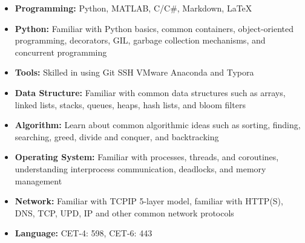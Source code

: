 \ifzh
{}
\begin{competences}
\end{competences}
\else
{}
\begin{itemize}[leftmargin=1.5em]
    \item \textbf{Programming:} Python, MATLAB, C/C\#, Markdown, \LaTeX
    \item \textbf{Python:} Familiar with Python basics, common containers, object-oriented programming, decorators, GIL, garbage collection mechanisms, and concurrent programming
    \item \textbf{Tools:} Skilled in using Git SSH VMware Anaconda and Typora
    \item \textbf{Data Structure:} Familiar with common data structures such as arrays, linked lists, stacks, queues, heaps, hash lists, and bloom filters
    \item \textbf{Algorithm:} Learn about common algorithmic ideas such as sorting, finding, searching, greed, divide and conquer, and backtracking
    \item \textbf{Operating System:} Familiar with processes, threads, and coroutines, understanding interprocess communication, deadlocks, and memory management
    \item \textbf{Network:} Familiar with TCPIP 5-layer model, familiar with HTTP(S), DNS, TCP, UPD, IP and other common network protocols
    \item \textbf{Language:} CET-4: 598, CET-6: 443
\end{itemize}
\fi